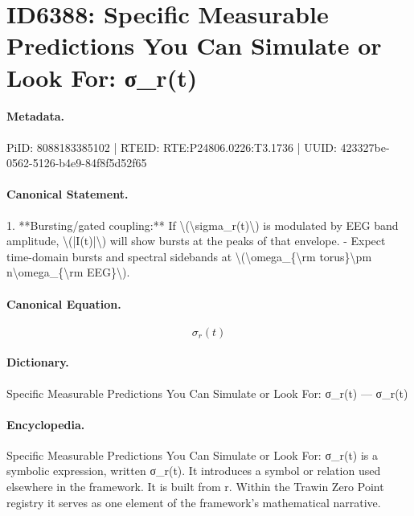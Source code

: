 \section*{ID6388: Specific Measurable Predictions You Can Simulate or Look For: σ\_r(t)}
\paragraph{Metadata.}
PiID: 8088183385102 | RTEID: RTE:P24806.0226:T3.1736 | UUID: 423327be-0562-5126-b4e9-84f8f5d52f65

\paragraph{Canonical Statement.}
1. **Bursting/gated coupling:** If \textbackslash{}(\textbackslash{}sigma\_r(t)\textbackslash{}) is modulated by EEG band amplitude, \textbackslash{}(|I(t)|\textbackslash{}) will show bursts at the peaks of that envelope. - Expect time-domain bursts and spectral sidebands at \textbackslash{}(\textbackslash{}omega\_\{\textbackslash{}rm torus\}\textbackslash{}pm n\textbackslash{}omega\_\{\textbackslash{}rm EEG\}\textbackslash{}).

\paragraph{Canonical Equation.}
\[
\sigma_r(t)
\]

\paragraph{Dictionary.}
Specific Measurable Predictions You Can Simulate or Look For: σ\_r(t) — σ\_r(t)

\paragraph{Encyclopedia.}
Specific Measurable Predictions You Can Simulate or Look For: σ\_r(t) is a symbolic expression, written σ\_r(t). It introduces a symbol or relation used elsewhere in the framework. It is built from r. Within the Trawin Zero Point registry it serves as one element of the framework's mathematical narrative.

